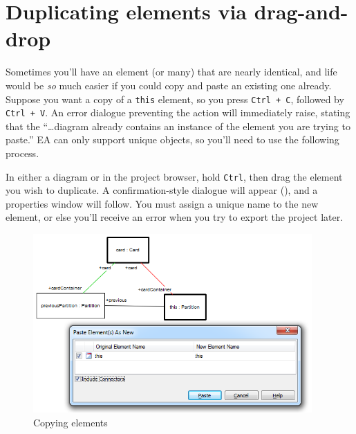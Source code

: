 \newpage

\section{Duplicating elements via drag-and-drop}

Sometimes you'll have an element (or many) that are nearly identical, and life would be \emph{so} much easier if you could copy and paste an existing one
already. Suppose you want a copy of a \texttt{this} element, so you press \texttt{Ctrl + C}, followed by \texttt{Ctrl + V}. An error dialogue preventing the
action will immediately raise, stating that the ``\ldots diagram already contains an instance of the element you are trying to paste.'' EA can only support
unique objects, so you'll need to use the following process.

\begin{stepbystep}

\item In either a diagram or in the project browser, hold \texttt{Ctrl}, then drag the element you wish to duplicate. A
confirmation-style dialogue will appear (), and a properties window will follow. You must assign a unique name to the new element, or
else you'll receive an error when you try to export the project later.

\vspace{0.5cm}

\begin{figure}[htbp]
\begin{center}
  \includegraphics[width=0.95\textwidth]{../../org.moflon.doc.handbook.05_miscellaneous/1_grokkingEA/06_duplicating/ea_duplicatingElements}
  \caption{Copying elements}  
  \label{ea:dupWindow}
\end{center}
\end{figure}

\end{stepbystep}
